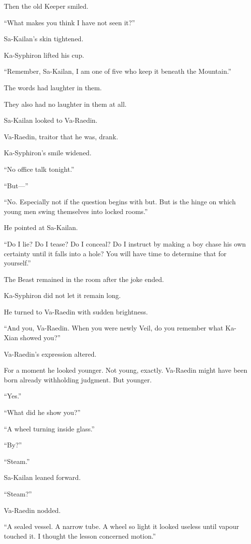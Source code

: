Then the old Keeper smiled.\par
“What makes you think I have not seen it?”\par
Sa-Kailan’s skin tightened.\par
Ka-Syphiron lifted his cup.\par
“Remember, Sa-Kailan, I am one of five who keep it beneath the Mountain.”\par
The words had laughter in them.\par
They also had no laughter in them at all.\par
Sa-Kailan looked to Va-Raedin.\par
Va-Raedin, traitor that he was, drank.\par
Ka-Syphiron’s smile widened.\par
“No office talk tonight.”\par
“But—”\par
“No. Especially not if the question begins with but. But is the hinge on which young men swing themselves into locked rooms.”\par
He pointed at Sa-Kailan.\par
“Do I lie? Do I tease? Do I conceal? Do I instruct by making a boy chase his own certainty until it falls into a hole? You will have time to determine that for yourself.”\par
The Beast remained in the room after the joke ended.\par
Ka-Syphiron did not let it remain long.\par
He turned to Va-Raedin with sudden brightness.\par
“And you, Va-Raedin. When you were newly Veil, do you remember what Ka-Xian showed you?”\par
Va-Raedin’s expression altered.\par
For a moment he looked younger. Not young, exactly. Va-Raedin might have been born already withholding judgment. But younger.\par
“Yes.”\par
“What did he show you?”\par
“A wheel turning inside glass.”\par
“By?”\par
“Steam.”\par
Sa-Kailan leaned forward.\par
“Steam?”\par
Va-Raedin nodded.\par
“A sealed vessel. A narrow tube. A wheel so light it looked useless until vapour touched it. I thought the lesson concerned motion.”\par

